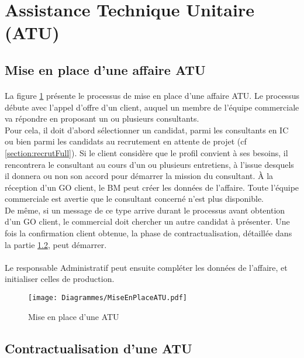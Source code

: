 \section{Assistance Technique Unitaire (ATU)}

\subsection{Mise en place d'une affaire ATU}

\paragraph{}La figure \ref{mepATU} présente le processus de mise en place d'une affaire ATU. Le processus débute avec l'appel d'offre d'un client, auquel un membre de l'équipe commerciale va répondre en proposant un ou plusieurs consultants.\\ Pour cela, il doit d'abord sélectionner un candidat, parmi les consultants en IC ou bien parmi les candidats au recrutement en attente de projet (cf \ref{section:recrutFull}).
Si le client considère que le profil convient à ses besoins, il rencontrera le consultant au cours d'un ou plusieurs entretiens, à l'issue desquels il donnera ou non son accord pour démarrer la mission du consultant. À la réception d'un GO client, le BM peut créer les données de l'affaire. Toute l'équipe commerciale est avertie que le consultant concerné n'est plus disponible.\\ De même, si un message de ce type arrive durant le processus avant obtention d'un GO client, le commercial doit chercher un autre candidat à présenter.
Une fois la confirmation client obtenue, la phase de contractualisation, détaillée dans la partie \ref{subsection:contractATU}, peut démarrer.

\paragraph{} Le responsable Administratif peut ensuite compléter les données de l'affaire, et initialiser celles de production.

\begin{figure}[H]
	\centering
	\texttt{[image: Diagrammes/MiseEnPlaceATU.pdf]}
	\caption{Mise en place d'une ATU} 
	\label{mepATU}
\end{figure}
	
	
\subsection{Contractualisation d'une ATU}
\label{subsection:contractATU}

